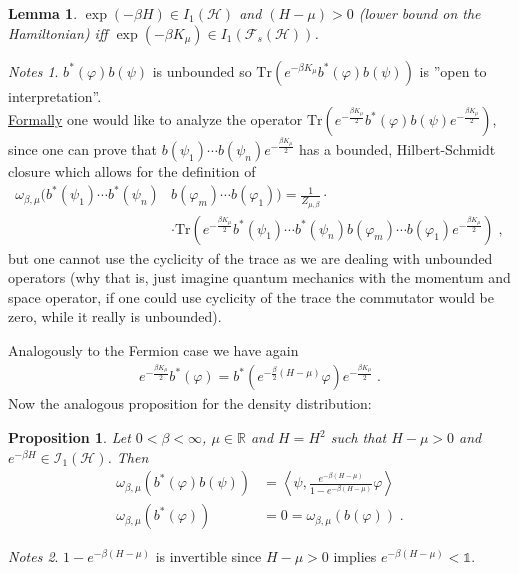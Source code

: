 \documentclass[
a4paper, %
11pt, %
onecolumn, %
openany, %
]{memoir}
\theoremstyle{definition}
\theoremstyle{remark}
\newtheorem{notes}{Notes}[chapter]
\theoremstyle{plain}
\newtheorem{prop}{Proposition}[chapter]
\newtheorem{lemma}{Lemma}[chapter]
\begin{document}
\begin{lemma}
	$\exp(-\beta H)\in I_1(\mathcal{H})$ and $(H-\mu)>0$ (lower bound on the Hamiltonian) iff $\exp(-\beta K_{\mu})\in I_1(\mathcal{F}_s(\mathcal{H}))$.
\end{lemma}
\begin{notes}
	$b^*(\varphi)b(\psi)$ is unbounded so $\mathrm{Tr}(e^{-\beta K_{\mu}}b^*(\varphi)b(\psi))$ is ''open to interpretation''.\\
	\underline{Formally} one would like to analyze the operator $\mathrm{Tr}\left( e^{-\frac{\beta K_{\mu}}{2}}b^*(\varphi)b(\psi)e^{-\frac{\beta K_{\mu}}{2}}\right)$, since one can prove that $b(\psi_1)\cdots b(\psi_n)e^{-\frac{\beta K_{\mu}}{2}}$ has a bounded, Hilbert-Schmidt closure which allows for the definition of \begin{align}
		\omega_{\beta,\mu}(b^*(\psi_1)\cdots b^*(\psi_n)&b(\varphi_m)\cdots b(\varphi_1))=\frac{1}{Z_{\mu,\beta}}\cdot \\ &\cdot \mathrm{Tr}\left(e^{-\frac{\beta K_{\mu}}{2}}b^*(\psi_1)\cdots b^*(\psi_n)b(\varphi_m)\cdots b(\varphi_1)e^{-\frac{\beta K_{\mu}}{2}}\right)\; ,
	\end{align}
	but one cannot use the cyclicity of the trace as we are dealing with unbounded operators (why that is, just imagine quantum mechanics with the momentum and space operator, if one could use cyclicity of the trace the commutator would be zero, while it really is unbounded).
\end{notes}
Analogously to the Fermion case we have again \begin{align}
e^{-\frac{\beta K_{\mu}}{2}}b^*(\varphi)=b^*(e^{-\frac{\beta }{2}(H-\mu)}\varphi)e^{-\frac{\beta K_{\mu}}{2}}\; .\label{eqn::boson_relation}
\end{align}Now the analogous proposition for the density distribution:
\begin{prop} Let $0<\beta<\infty$, $\mu\in\mathbb{R}$ and $H=H^2$ such that $H-\mu>0$ and $e^{-\beta H}\in \mathcal{I_1(\mathcal{H})}$. Then \begin{align}
\omega_{\beta,\mu}(b^*(\varphi)b(\psi))&=\left\langle\psi, \frac{e^{-\beta(H-\mu)}}{1-e^{-\beta(H-\mu)}}\varphi\right\rangle\\
\omega_{\beta,\mu}(b^*(\varphi))&=0=\omega_{\beta,\mu}(b(\varphi))\; .
\end{align}
\end{prop}
\begin{notes}
	$1-e^{-\beta(H-\mu)}$ is invertible since $H-\mu>0$ implies $e^{-\beta(H-\mu)}<\mathds{1}$.
\end{notes}
\end{document}
